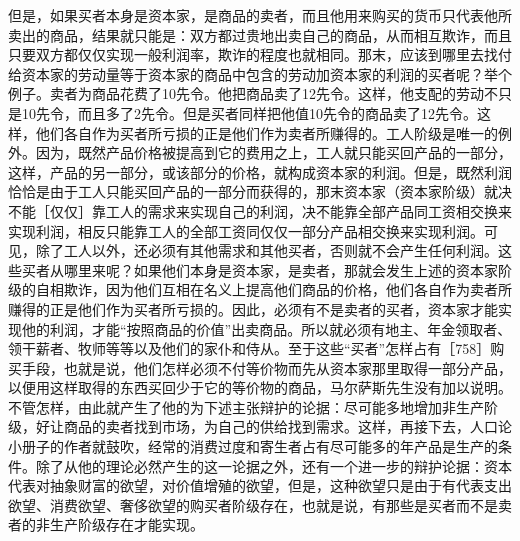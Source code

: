 但是，如果买者本身是资本家，是商品的卖者，而且他用来购买的货币只代表他所卖出的商品，结果就只能是：双方都过贵地出卖自己的商品，从而相互欺诈，而且只要双方都仅仅实现一般利润率，欺诈的程度也就相同。那末，应该到哪里去找付给资本家的劳动量等于资本家的商品中包含的劳动加资本家的利润的买者呢？举个例子。卖者为商品花费了10先令。他把商品卖了12先令。这样，他支配的劳动不只是10先令，而且多了2先令。但是买者同样把他值10先令的商品卖了12先令。这样，他们各自作为买者所亏损的正是他们作为卖者所赚得的。工人阶级是唯一的例外。因为，既然产品价格被提高到它的费用之上，工人就只能买回产品的一部分，这样，产品的另一部分，或该部分的价格，就构成资本家的利润。但是，既然利润恰恰是由于工人只能买回产品的一部分而获得的，那末资本家（资本家阶级）就决不能［仅仅］靠工人的需求来实现自己的利润，决不能靠全部产品同工资相交换来实现利润，相反只能靠工人的全部工资同仅仅一部分产品相交换来实现利润。可见，除了工人以外，还必须有其他需求和其他买者，否则就不会产生任何利润。这些买者从哪里来呢？如果他们本身是资本家，是卖者，那就会发生上述的资本家阶级的自相欺诈，因为他们互相在名义上提高他们商品的价格，他们各自作为卖者所赚得的正是他们作为买者所亏损的。因此，必须有不是卖者的买者，资本家才能实现他的利润，才能“按照商品的价值”出卖商品。所以就必须有地主、年金领取者、领干薪者、牧师等等以及他们的家仆和侍从。至于这些“买者”怎样占有［758］购买手段，也就是说，他们怎样必须不付等价物而先从资本家那里取得一部分产品，以便用这样取得的东西买回少于它的等价物的商品，马尔萨斯先生没有加以说明。不管怎样，由此就产生了他的为下述主张辩护的论据：尽可能多地增加非生产阶级，好让商品的卖者找到市场，为自己的供给找到需求。这样，再接下去，人口论小册子的作者就鼓吹，经常的消费过度和寄生者占有尽可能多的年产品是生产的条件。除了从他的理论必然产生的这一论据之外，还有一个进一步的辩护论据：资本代表对抽象财富的欲望，对价值增殖的欲望，但是，这种欲望只是由于有代表支出欲望、消费欲望、奢侈欲望的购买者阶级存在，也就是说，有那些是买者而不是卖者的非生产阶级存在才能实现。


